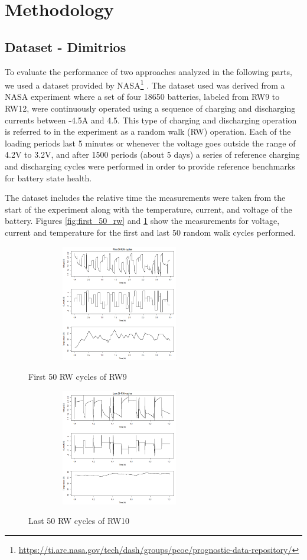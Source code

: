 \section{Methodology}

\subsection{Dataset - Dimitrios}

To evaluate the performance of two approaches analyzed in the following parts, we used a dataset provided by NASA\footnote{\url{https://ti.arc.nasa.gov/tech/dash/groups/pcoe/prognostic-data-repository/}} \cite{bole2014adaptation}. The dataset used was derived from a NASA experiment where a set of four 18650 \lib batteries, labeled from RW9 to RW12, were continuously operated using a sequence of charging and discharging currents between -4.5A and 4.5. This type of charging and discharging operation is referred to in the experiment as a random walk (RW) operation. Each of the loading periods last 5 minutes or whenever the voltage goes outside the range of 4.2V to 3.2V, and after 1500 periods (about 5 days) a series of reference charging and discharging cycles were performed in order to provide reference benchmarks for battery state health.

The dataset includes the relative time the measurements were taken from the start of the experiment along with the temperature, current, and voltage of the battery. Figures \ref{fig:first_50_rw} and \ref{fig:last_50_rw} show the measurements for voltage, current and temperature for the first and last 50 random walk cycles performed.

\begin{figure}
\begin{multicols}{2}
	\includegraphics[height=2in, width=3.2in]{figures/GPR/first_50_rw}
	\caption{First 50 RW cycles of RW9}
	\label{fig:first_50_rw}
	\includegraphics[height=2in, width=3.2in]{figures/GPR/last_50_rw}
	\caption{Last 50 RW cycles of RW10}
	\label{fig:last_50_rw}
\end{multicols}
\end{figure}

